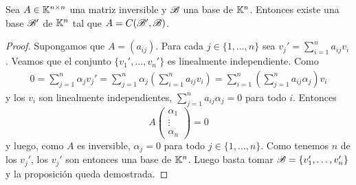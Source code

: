 \begin{prop}
	\label{pro:C(-,B)}
	Sea $A\in\mathbb{K}^{n\times n}$ una matriz inversible y $\mathscr{B}$ una base de $\mathbb{K}^n$.
	Entonces existe una base $\mathscr{B}'$ de $\mathbb{K}^n$ tal que $A=C(\mathscr{B}',\mathscr{B})$.

	\begin{proof}
		Supongamos que $A=(a_{ij})$. Para cada $j\in\{1,\dots,n\}$ sea
		$v_j'=\sum_{i=1}^n a_{ij}v_i$.  Veamos que el conjunto
		$\{v_1',\dots,v_n'\}$ es linealmente independiente. Como
		\begin{align*}
			0=\sum_{j=1}^n\alpha_jv_j'=\sum_{j=1}^n\alpha_j\left(\sum_{i=1}^n a_{ij}v_i\right)=\sum_{i=1}^n\left(\sum_{j=1}^n a_{ij}\alpha_j\right)v_i
		\end{align*}
		y los $v_i$ son linealmente independientes, $\sum_{j=1}^n
		a_{ij}\alpha_j=0$ para todo $i$. Entonces 
		\[
			A\begin{pmatrix}
				\alpha_1\\
				\vdots\\
				\alpha_n
			\end{pmatrix}=0
		\]
		y luego, como $A$ es inversible, $\alpha_j=0$ para todo
		$j\in\{1,\dots,n\}$. Como tenemos $n$ de los $v_j'$, 
		los $v_j'$ son entonces una base de $\mathbb{K}^n$. Luego basta tomar
		$\mathscr{B}=\{v_1',\dots,v_n'\}$ y la proposición queda demostrada. 
	\end{proof}
\end{prop}

